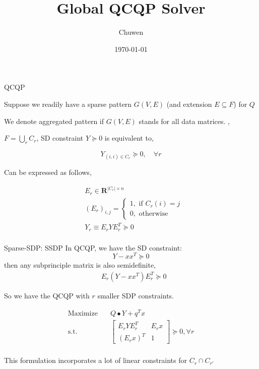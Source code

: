 
\usepackage{subfig}
\usepackage[style=authoryear]{biblatex}
\usepackage{bm}
\title{Global QCQP Solver}
\author{Chuwen}
\date{\today}




\fontsize{9pt}{10}\selectfont
\frame{\titlepage}



\begin{frame}{QCQP}

  Suppose we readily have a sparse pattern \(G(V, E)\) (and extension \(E\subseteq F\)) for \(Q\)

  We denote aggregated pattern if \(G(V, E)\) stands for all data matrices. \cite{fukuda_exploiting_2001}, \cite{zheng_chordal_2020}

  \(F = \bigcup_r C_r\), SD constraint \(Y \succeq 0\) is equivalent to,

  \[Y_{(i, i) \in C_r} \succeq 0, \quad \forall r\]

  Can be expressed as follows,

  \begin{equation}
    \begin{aligned}
       & E_r \in \mathbf R^{|C_r|\times n}     \\
       & (E_r)_{i,j}=\begin{cases}
        1,  \text { if } C_r(i)=j \\
        0,  \text { otherwise }
      \end{cases} \\
       & Y_r\equiv E_r Y E_r^T \succeq 0       \\
    \end{aligned}
  \end{equation}
\end{frame}

\begin{frame}{Sparse-SDP: SSDP}
  In QCQP, we have the SD constraint:
  \[Y - xx^T \succeq 0\]
  then any subprinciple matrix is also semidefinite,
  \begin{equation}
    \begin{aligned}
       & E_r (Y - x x^T) E_r^T \succeq 0
    \end{aligned}
  \end{equation}

  So we have the QCQP with \(r\) smaller SDP constraints.

  \[\begin{aligned}
      \mathrm{Maximize}\quad & Q \bullet Y + q^Tx                               \\
      \mathrm{s.t.} \quad    & \begin{bmatrix}E_r Y E_r^T & E_rx \\ (E_rx)^T & 1\end{bmatrix}   \succeq 0, \forall r \\
    \end{aligned}\]

  This formulation incorporates a lot of linear constraints for \(C_r \cap C_{r'}\)
\end{frame}

